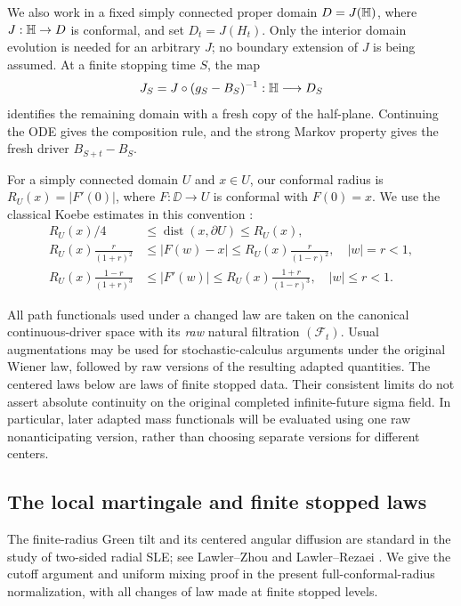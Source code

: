 We also work in a fixed simply connected proper domain
$D=J(\mathbb H)$, where $J:\mathbb H\to D$ is conformal, and set $D_t=J(H_t)$.
Only the interior domain evolution is needed for an arbitrary $J$;
no boundary extension of $J$ is being assumed. At a finite stopping time
$S$, the map
\[
 J_S=J\circ(g_S-B_S)^{-1}:\mathbb H\longrightarrow D_S
\]
identifies the remaining domain with a fresh copy of the half-plane.
Continuing the ODE gives the composition rule, and the strong Markov
property gives the fresh driver $B_{S+t}-B_S$.

For a simply connected domain $U$ and $x\in U$, our conformal radius is
$R_U(x)=|F'(0)|$, where $F:\DD\to U$ is conformal with $F(0)=x$.
We use the classical Koebe estimates in this convention
\cite[Theorem~3.2.5, Corollary~3.2.6, and Theorems~3.2.9
and~3.2.11]{Beliaev2015Notes}:
\begin{align}
 R_U(x)/4&\le\operatorname{dist}(x,\partial U)\le R_U(x),
 \label{op:koebe-distance}\\
 R_U(x)\frac{r}{(1+r)^2}
 &\le |F(w)-x|\le R_U(x)\frac{r}{(1-r)^2},
 \quad |w|=r<1, \label{op:koebe-growth}\\
 R_U(x)\frac{1-r}{(1+r)^3}
 &\le |F'(w)|\le R_U(x)\frac{1+r}{(1-r)^3},
 \quad |w|\le r<1. \label{op:koebe-derivative}
\end{align}

All path functionals used under a changed law are taken on the canonical
continuous-driver space with its \emph{raw} natural filtration
$(\mathcal F_t)$. Usual augmentations may be used for stochastic-calculus
arguments under the original Wiener law, followed by raw versions of the
resulting adapted quantities. The centered laws below are laws of finite
stopped data. Their consistent limits do not assert absolute continuity
on the original completed infinite-future sigma field. In particular,
later adapted mass functionals will be evaluated using one raw
nonanticipating version, rather than choosing separate versions for
different centers.

\subsection{The local martingale and finite stopped laws}

The finite-radius Green tilt and its centered angular diffusion are
standard in the study of two-sided radial SLE; see
Lawler--Zhou \cite[Section~2.1]{LawlerZhou2013} and
Lawler--Rezaei \cite[Section~4.2, equations~(38)--(40)]{LawlerRezaei2015}.
We give the cutoff argument and uniform mixing proof in the present
full-conformal-radius normalization, with all changes of law made at
finite stopped levels.

